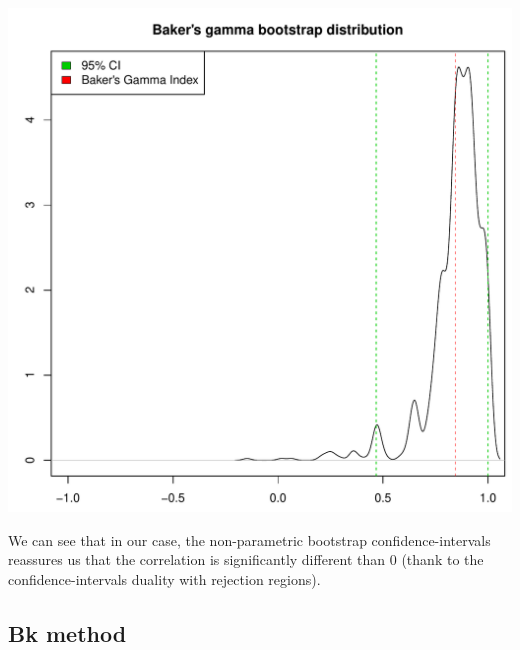 \documentclass[shortnames,nojss,article]{jss}\usepackage[]{graphicx}\usepackage[]{color}
\makeatletter
\def\maxwidth{ %
  \ifdim\Gin@nat@width>\linewidth
    \linewidth
  \else
    \Gin@nat@width
  \fi
}
\newenvironment{knitrout}{}{} %
\makeatother
\begin{document}
\begin{knitrout}
{\centering \includegraphics[width=\maxwidth]{figure/cor_bakers_gamma_simulation_CI_43} 

}



\end{knitrout}


We can see that in our case, the non-parametric bootstrap confidence-intervals reassures us that the correlation is significantly different than 0 (thank to the confidence-intervals duality with rejection regions). 



\subsection{Bk method}
\end{document}
